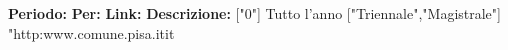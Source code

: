 \documentclass[a4paper,10pt]{article}
\begin{document}
\textbf{Periodo:} \newline
\textbf{Per:}\newline
\textbf{Link:} \url{} \newline
\textbf{Descrizione:}  	["0"]	Tutto l'anno	["Triennale","Magistrale"]	"http:\/\/www.comune.pisa.it\/it\/
\end{document}
